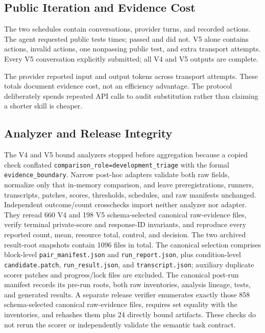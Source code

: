 \documentclass[letterpaper]{article} %
\begin{document}
\subsection{Public Iteration and Evidence Cost}

The two schedules contain \AllProviderConversations{} conversations,
\AllProviderTurns{} provider turns, and \AllActions{} recorded actions.  The
agent requested public tests \AllPublicTestRequests{} times;
\AllPublicTestPasses{} passed and \AllPublicTestFailures{} did not.  V5 alone
contains \VFiveActions{} actions, \VFiveInvalidActions{} invalid actions, one
nonpassing public test, and \VFiveExtraTransportAttempts{} extra transport
attempts.  Every V5 conversation explicitly submitted; all V4 and V5 outputs are
complete.

The provider reported \AllInputTokens{} input and \AllOutputTokens{} output
tokens across \AllTransportAttempts{} transport attempts.  These totals document
evidence cost, not an efficiency advantage.  The protocol deliberately spends
repeated API calls to audit substitution rather than claiming a shorter skill is
cheaper.

\subsection{Analyzer and Release Integrity}

The V4 and V5 bound analyzers stopped before aggregation because a copied check
conflated \texttt{comparison\_role=development\_triage} with the formal
\texttt{evidence\_boundary}.  Narrow post-hoc adapters validate both raw fields,
normalize only that in-memory comparison, and leave preregistrations, runners,
transcripts, patches, scores, thresholds, schedules, and raw manifests unchanged.
Independent outcome/count crosschecks import neither analyzer nor adapter.  They
reread 660 V4 and 198 V5 schema-selected canonical raw-evidence files, verify
terminal private-score and response-ID invariants,
and reproduce every reported count, mean, resource total, control, and decision.
The two archived result-root snapshots contain 1096 files in total.  The canonical selection comprises
block-level \texttt{pair\_manifest.json} and \texttt{run\_report.json}, plus
condition-level \texttt{candidate.patch}, \texttt{run\_result.json}, and
\texttt{transcript.json}; auxiliary duplicate scorer patches and progress/lock
files are excluded.  The canonical post-run manifest records its pre-run roots,
both raw inventories,
analysis lineage, tests, and generated results.  A separate release verifier
enumerates exactly those 858 schema-selected canonical raw-evidence files, requires
set equality with the inventories, and rehashes them plus 24 directly bound
artifacts.  These checks do not
rerun the scorer or independently validate the semantic task contract.
\end{document}
